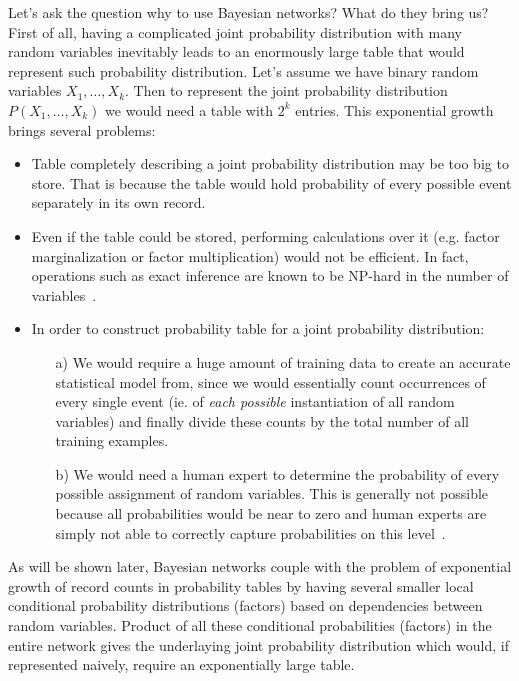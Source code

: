 \documentclass[english,cover]{fitthesis} %
\begin{document}
Let's ask the question why to use Bayesian networks? What do they bring us? First of all, having a complicated joint probability distribution with many random variables inevitably leads to an enormously large table that would represent such probability distribution. Let's assume we have binary random variables $X_1, \dots, X_k$. Then to represent the joint probability distribution $P(X_1, \dots, X_k)$ we would need a table with $2^k$ entries. This exponential growth brings several problems:
\begin{itemize}
    \item Table completely describing a joint probability distribution may be too big to store. That is because the table would hold probability of every possible event separately in its own record.
    \item Even if the table could be stored, performing calculations over it (e.g. factor marginalization or factor multiplication) would not be efficient. In fact, operations such as exact inference are known to be NP-hard in the number of variables~\cite{pgm}.
    \item In order to construct probability table for a joint probability distribution:
    \begin{enumerate}
        \item[a)] We would require a huge amount of training data to create an accurate statistical model from, since we would essentially count occurrences of every single event (ie. of \emph{each possible} instantiation of all random variables) and finally divide these counts by the total number of all training examples.
        \item[b)] We would need a human expert to determine the probability of every possible assignment of random variables. This is generally not possible because all probabilities would be near to zero and human experts are simply not able to correctly capture probabilities on this level~\cite{pgm}.
    \end{enumerate}
\end{itemize}

As will be shown later, Bayesian networks couple with the problem of exponential growth of record counts in probability tables by having several smaller local conditional probability distributions (factors) based on dependencies between random variables. Product of all these conditional probabilities (factors) in the entire network gives the underlaying joint probability distribution which would, if represented naively, require an exponentially large table.
\end{document}
